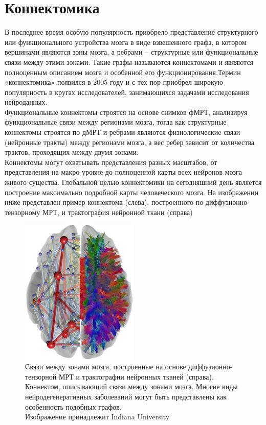 \section{Коннектомика}
\indent В последнее время особую популярность приобрело представление структурного или функционального устройства мозга в виде взвешенного графа, в котором вершинами являются зоны мозга, а ребрами – структурные или функциональные связи между этими зонами. Такие графы называются коннектомами и являются полноценным описанием мозга и особенной его функционирования.Термин «коннектомика» появился в 2005 году и с тех пор приобрел широкую популярность в кругах исследователей, занимающихся задачами исследования нейроданных.\\
\indent Функциональные коннектомы строятся на основе снимков фМРТ, анализируя функциональные связи между регионами мозга, тогда как структурные коннектомы строятся по дМРТ и ребрами являются физиологические связи (нейронные тракты) между регионами мозга, а вес ребер зависит от количества трактов, проходящих между двумя зонами. \\
\newpage
\indent Коннектомы могут охватывать представления разных масштабов, от представления на макро-уровне до полноценной карты всех нейронов мозга живого существа. Глобальной целью коннектомики на сегодняшний день является построение максимально подробной карты человеческого мозга. 
На изображении ниже представлен пример коннектома (слева), построенного по диффузионно-тензорному МРТ, и трактография нейронной ткани (справа)

\begin{figure}[h!]
    \centering
    \includegraphics[width=0.5\textwidth]{img/connectome.jpg}
    \caption{Связи между зонами мозга, построенные на основе диффузионно-тензорной МРТ и трактографии нейронных тканей (справа). Коннектом, описывающий связи между зонами мозга. Многие виды нейродегенеративных заболеваний могут быть представлены как особенность подобных графов. \\ Изображение принадлежит Indiana University}
    \label{fig:my_label}
\end{figure}